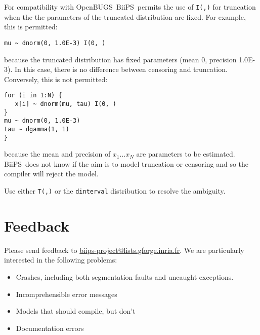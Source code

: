 \documentclass[11pt, a4paper, titlepage]{report}
\makeatletter
\newcommand{\biips}{\textsf{BiiPS}}
\newcommand{\email}{\url{biips-project@lists.gforge.inria.fr}}
\newcommand{\OpenBUGS}{\textsf{OpenBUGS}}
\makeatother
\begin{document}
For compatibility with \OpenBUGS\, \biips\ permits the use of \texttt{I(,)}
for truncation when the the parameters of the truncated distribution
are fixed.  For example, this is permitted:
\begin{verbatim}
mu ~ dnorm(0, 1.0E-3) I(0, )
\end{verbatim}
because the truncated distribution has fixed parameters (mean 0,
precision 1.0E-3).  In this case, there is no difference between 
censoring and truncation.  Conversely, this is not permitted:
\begin{verbatim}
for (i in 1:N) {
   x[i] ~ dnorm(mu, tau) I(0, )
}
mu ~ dnorm(0, 1.0E-3)
tau ~ dgamma(1, 1)
}
\end{verbatim}
because the mean and precision of $x_1 \dots x_N$ are parameters to be
estimated.  \biips\ does not know if the aim is to model truncation or censoring
and so the compiler will reject the model.

Use either \texttt{T(,)} or the \texttt{dinterval} distribution to resolve the ambiguity.

% 

\chapter{Feedback}

Please send feedback to \email{}.
We are particularly interested in the following problems:

\begin{itemize}
\item Crashes, including both segmentation faults and uncaught exceptions.
\item Incomprehensible error messages
\item Models that should compile, but don't 
\item Documentation errors
\end{itemize}
\end{document}
